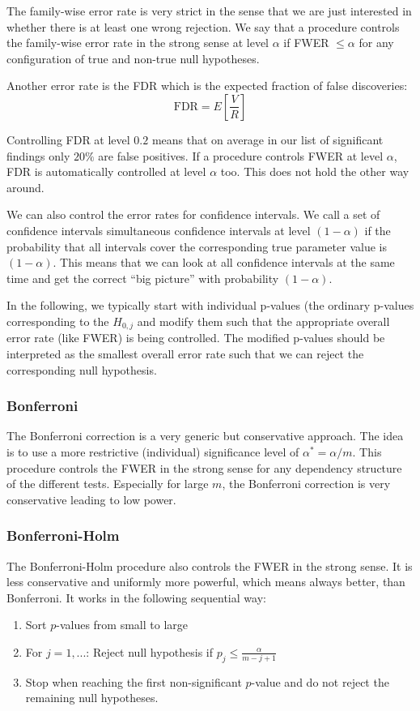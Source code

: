 The family-wise error rate is very strict in the sense that we are just interested in whether there is at least one wrong rejection. We say that a procedure controls the family-wise error rate in the strong sense at level $\alpha$ if FWER $\leq \alpha$ for any configuration of true and non-true null hypotheses. \medskip

Another error rate is the FDR which is the expected fraction of false discoveries:
$$\text{FDR} = E \left[ \frac{V}{R} \right]$$

Controlling FDR at level $0.2$ means that on average in our list of significant findings only $20\%$ are false positives. If a procedure controls FWER at level $\alpha$, FDR is automatically controlled at level $\alpha$ too. This does not hold the other way around. \medskip

We can also control the error rates for confidence intervals. We call a set of confidence intervals simultaneous confidence intervals at level $(1 - \alpha)$ if the probability that all intervals cover the corresponding true parameter value is $(1 - \alpha)$. This means that we can look at all confidence intervals at the same time and get the correct “big picture” with probability $(1 - \alpha)$.

In the following, we typically start with individual p-values (the ordinary p-values corresponding to the $H_{0,j}$ and modify them such that the appropriate overall error rate (like FWER) is being controlled. The modified p-values should be interpreted as the smallest overall error rate such that we can reject the corresponding null hypothesis.

\subsubsection{Bonferroni}

The Bonferroni correction is a very generic but conservative approach. The idea is to use a more restrictive (individual) significance level of $\alpha^* = \alpha / m$. This procedure controls the FWER in the strong sense for any dependency structure of the different tests. Especially for large $m$, the Bonferroni correction is very conservative leading to low power.

\subsubsection{Bonferroni-Holm}

The Bonferroni-Holm procedure also controls the FWER in the strong sense. It is less conservative and uniformly more powerful, which means always better, than Bonferroni. It works in the following sequential way:
\begin{enumerate}
	\item Sort $p$-values from small to large
	\item For $j = 1,...$: Reject null hypothesis if $p_j \leq \frac{\alpha}{m-j+1}$
	\item Stop when reaching the first non-significant $p$-value and do not reject the remaining null hypotheses.
\end{enumerate}

